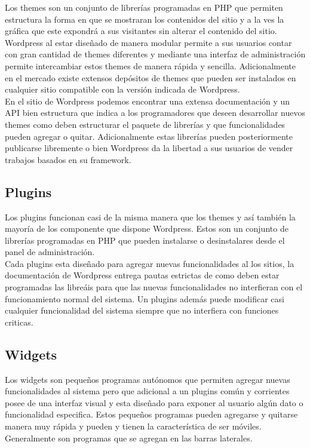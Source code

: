 Los themes son un conjunto de librerías programadas en PHP que permiten estructura la forma en que se mostraran los contenidos del sitio y a la ves la gráfica que este expondrá a sus visitantes sin alterar el contenido del sitio. Wordpress al estar diseñado de manera modular permite a sus usuarios contar con gran cantidad de themes diferentes y mediante una interfaz de administración permite intercambiar estos themes de manera rápida y sencilla. Adicionalmente en el mercado existe extensos depósitos de themes que pueden ser instalados en cualquier sitio compatible con la versión indicada de Wordpress.\\

En el sitio de Wordpress podemos encontrar una extensa documentación y un API bien estructura que indica a los programadores que deseen desarrollar nuevos themes como deben estructurar el paquete de librerías y que funcionalidades pueden agregar o quitar. Adicionalmente estas librerías pueden posteriormente publicarse libremente o bien Wordpress da la libertad a sus usuarios de vender trabajos basados en su framework.

\subsection{Plugins}
Los plugins funcionan casi de la misma manera que los themes y así también la mayoría de los componente que dispone Wordpress. Estos son un conjunto de librerías programadas en PHP que pueden instalarse o desinstalares desde el panel de administración.\\

Cada plugins esta diseñado para agregar nuevas funcionalidades al los sitios, la documentación de Wordpress entrega pautas estrictas de como deben estar programadas las libreáis para que las nuevas funcionalidades no interfieran con el funcionamiento normal del sistema. Un plugins además puede modificar casi cualquier funcionalidad del sistema siempre que no interfiera con funciones criticas.

\subsection{Widgets}
Los widgets son pequeños programas autónomos que permiten agregar nuevas funcionalidades al sistema pero que adicional a un plugins común y corrientes posee de una interfaz visual y esta diseñado para exponer al usuario algún dato o funcionalidad especifica. Estos pequeños programas pueden agregarse y quitarse manera muy rápida y pueden y tienen la característica de ser móviles. Generalmente son programas que se agregan en las barras laterales.

